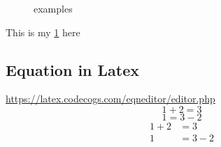 \begin{figure}[h!]%
\centering
{}
\quad
{}
\quad
{} %
\caption{examples}\label{fig:label1} 
\end{figure}
This is my \ref{fig:label1} here
\subsection{Equation in Latex}
\href{online latex equation}{https://latex.codecogs.com/eqneditor/editor.php}
\begin{equation}
  1 + 2 = 3 
\end{equation}%
\begin{equation*}
  1 = 3 - 2
\end{equation*}
\begin{align*}
  1 + 2 &= 3\\
  1 &= 3 - 2
\end{align*}





